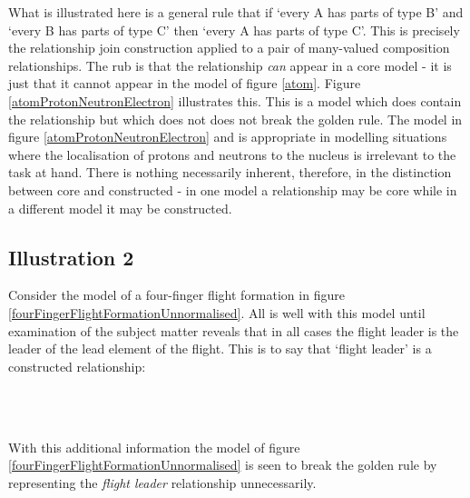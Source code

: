 \noindent What is illustrated here is a general rule that if `every A has parts of type B' and `every B has parts of type C' then `every A has parts of type C'. This is precisely the relationship join construction applied to a pair of many-valued composition relationships.
\noindent The rub is that the relationship  \emph{can} appear in a core model - it is just that it cannot appear in the model of figure \ref{atom}. Figure \ref{atomProtonNeutronElectron} illustrates this. This is a model which does contain the relationship but which does not does not break the golden rule. 
The model in figure \ref{atomProtonNeutronElectron} and is appropriate in modelling situations where the localisation of protons and neutrons to the nucleus is irrelevant to the task at hand. 
There is nothing necessarily inherent, therefore, in the distinction between core and constructed - in one model a relationship may be core while in a different model it may be constructed.  \\



\subsection{Illustration 2}
Consider the model of a four-finger flight formation in figure \ref{fourFingerFlightFormationUnnormalised}. All is well with this model until examination of the subject matter reveals that
in all cases the flight leader is the leader of the lead element of the flight. This is to say that `flight leader' is a constructed relationship:\\

\begin{equation}
\raisebox{-1.15cm}{

}
\end{equation}

\noindent With this additional information the model of figure \ref{fourFingerFlightFormationUnnormalised} is seen to break the golden rule by representing the \textit{flight leader} relationship unnecessarily.\\



